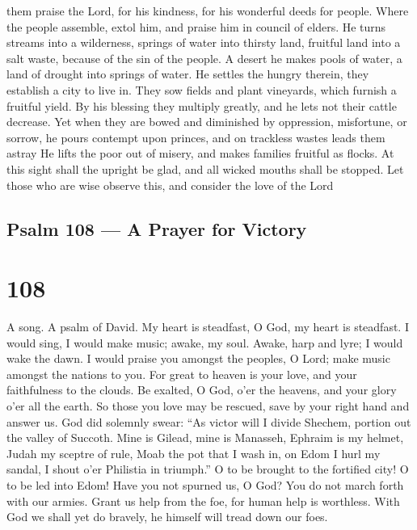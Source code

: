 them praise the Lord, for his kindness, for his wonderful deeds for
people.  Where the people assemble, extol him, and praise
him in council of elders.  He turns streams into a
wilderness, springs of water into thirsty land,  fruitful
land into a salt waste, because of the sin of the people. 
A desert he makes pools of water, a land of drought into springs of
water.  He settles the hungry therein, they establish a
city to live in.  They sow fields and plant vineyards,
which furnish a fruitful yield.  By his blessing they
multiply greatly, and he lets not their cattle decrease. 
Yet when they are bowed and diminished by oppression, misfortune, or
sorrow,  he pours contempt upon princes, and on trackless
wastes leads them astray  He lifts the poor out of misery,
and makes families fruitful as flocks.  At this sight shall
the upright be glad, and all wicked mouths shall be stopped.
 Let those who are wise observe this, and consider the love
of the Lord

\hypertarget{psalm-108-a-prayer-for-victory}{%
\subsection{Psalm 108 --- A Prayer for
Victory}\label{psalm-108-a-prayer-for-victory}}

\hypertarget{section-107}{%
\section{108}\label{section-107}}

A song. A psalm of David.  My heart is steadfast, O God, my
heart is steadfast. I would sing, I would make music; awake, my soul.
 Awake, harp and lyre; I would wake the dawn.  I
would praise you amongst the peoples, O Lord; make music amongst the
nations to you.  For great to heaven is your love, and your
faithfulness to the clouds.  Be exalted, O God, o'er the
heavens, and your glory o'er all the earth.  So those you
love may be rescued, save by your right hand and answer us. 
God did solemnly swear: ``As victor will I divide Shechem, portion out
the valley of Succoth.  Mine is Gilead, mine is Manasseh,
Ephraim is my helmet, Judah my sceptre of rule,  Moab the
pot that I wash in, on Edom I hurl my sandal, I shout o'er Philistia in
triumph.''  O to be brought to the fortified city! O to be
led into Edom!  Have you not spurned us, O God? You do not
march forth with our armies.  Grant us help from the foe,
for human help is worthless.  With God we shall yet do
bravely, he himself will tread down our foes.

